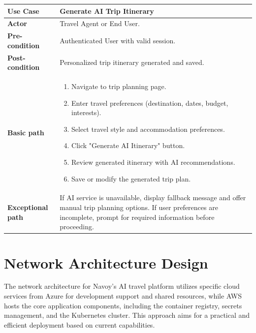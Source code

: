 \begin{longtable}{| p{} | p{} |}
    \textbf{Use Case}         & Generate AI Trip Itinerary                                                                                                                                                            \\
    \hline
    \textbf{Actor}            & Travel Agent or End User.                                                                                                                                                             \\
    \hline
    \textbf{Pre-condition}    & Authenticated User with valid session.                                                                                                                                                \\
    \hline
    \textbf{Post-condition}   & Personalized trip itinerary generated and saved.                                                                                                                                      \\
    \hline
    \textbf{Basic path}       & \begin{enumerate}
        \item Navigate to trip planning page.
        \item Enter travel preferences (destination, dates, budget, interests).
        \item Select travel style and accommodation preferences.
        \item Click "Generate AI Itinerary" button.
        \item Review generated itinerary with AI recommendations.
        \item Save or modify the generated trip plan.
    \end{enumerate}                                                                                                                                                            \\
    \hline
    \textbf{Exceptional path} & If AI service is unavailable, display fallback message and offer manual trip planning options. If user preferences are incomplete, prompt for required information before proceeding. \\
    \hline
\end{longtable}

\section{Network Architecture Design}
The network architecture for Navoy's AI travel platform utilizes specific cloud services from Azure for development support and shared resources, while AWS hosts the core application components, including the container registry, secrets management, and the Kubernetes cluster. This approach aims for a practical and efficient deployment based on current capabilities.

